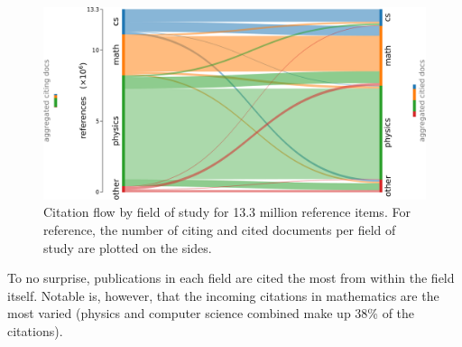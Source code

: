 \begin{figure}
  \centering
    \includegraphics[width=\textwidth]{figures/dataset/citation_relation_sankey.pdf}
  \caption[Citation flow by field of study for 13.3 million reference items.]{Citation flow by field of study for 13.3 million reference items. For reference, the number of citing and cited documents per field of study are plotted on the sides.}
  \label{fig:sankey}
\end{figure}

To no surprise, publications in each field are cited the most from within the field itself. Notable is, however, that the incoming citations in mathematics are the most varied (physics and computer science combined make up 38\% of the citations).
